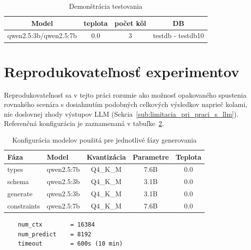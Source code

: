\begin{table}[H]
    \centering
    \small
    \begin{tabular}{cccc}
    \toprule
    
    \textbf{Model} & \textbf{teplota} & \textbf{počet kôl} & \textbf{DB} \\
    \midrule
        qwen2.5:3b/qwen2.5:7b & 0.0 & 3 & testdb - testdb10\\ \bottomrule          
    \end{tabular}
    \caption{Demonštrácia testovania}
    \label{tab:demonstracia_testovania}
\end{table}

\section{Reprodukovateľnosť experimentov}
Reprodukovateľnosť sa v tejto práci rozumie ako možnosť opakovaného spustenia rovnakého scenára s dosiahnutím podobných celkových výsledkov naprieč kolami, nie doslovnej zhody výstupov LLM (Sekcia~\ref{sub:limitacia_pri_praci_s_llm}). Referenčná konfigurácia je zaznamenaná v tabuľke~\ref{tab:repo_modely}.

\label{sub:k7_reprodukovatelnost_experimentov}
\begin{table}[H]
    \centering
    \begin{tabular}{l l c c c}
    \toprule
    \textbf{Fáza} & \textbf{Model} & \textbf{Kvantizácia} & \textbf{Parametre} & \textbf{Teplota} \\
    \midrule
    types       & qwen2.5:7b & Q4\_K\_M & 7.6B & 0.0 \\
    schema      & qwen2.5:3b & Q4\_K\_M & 3.1B & 0.0 \\
    generate    & qwen2.5:3b & Q4\_K\_M & 3.1B & 0.0 \\
    constraints & qwen2.5:7b & Q4\_K\_M & 7.6B & 0.0 \\
    \bottomrule
    \end{tabular}
    \caption{Konfigurácia modelov použitá pre jednotlivé fázy generovania}
    \label{tab:repo_modely}
\end{table}


\begin{lstlisting}
    num_ctx        = 16384
    num_predict    = 8192
    timeout        = 600s (10 min)
\end{lstlisting}

